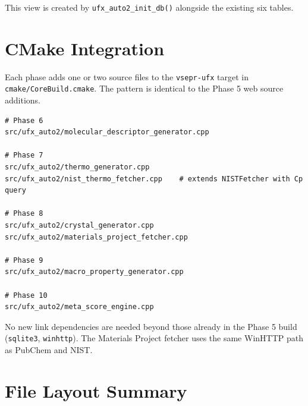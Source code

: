 \documentclass[11pt, a4paper]{article}
\begin{document}
This view is created by \texttt{ufx\_auto2\_init\_db()} alongside the existing
six tables.

\section{CMake Integration}

Each phase adds one or two source files to the \texttt{vsepr-ufx} target in
\texttt{cmake/CoreBuild.cmake}.  The pattern is identical to the Phase 5 web
source additions.

\begin{lstlisting}[language={}]
# Phase 6
src/ufx_auto2/molecular_descriptor_generator.cpp

# Phase 7
src/ufx_auto2/thermo_generator.cpp
src/ufx_auto2/nist_thermo_fetcher.cpp    # extends NISTFetcher with Cp query

# Phase 8
src/ufx_auto2/crystal_generator.cpp
src/ufx_auto2/materials_project_fetcher.cpp

# Phase 9
src/ufx_auto2/macro_property_generator.cpp

# Phase 10
src/ufx_auto2/meta_score_engine.cpp
\end{lstlisting}

No new link dependencies are needed beyond those already in the Phase 5 build
(\texttt{sqlite3}, \texttt{winhttp}).  The Materials Project fetcher uses the
same WinHTTP path as PubChem and NIST.

\section{File Layout Summary}
\end{document}
